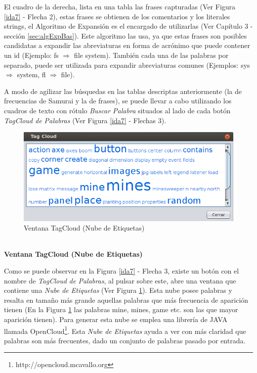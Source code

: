 El cuadro de la derecha, lista en una tabla las frases capturadas (Ver Figura \ref{ida7} - Flecha 2), estas frases se obtienen de los comentarios y los literales strings, el Algoritmo de Expansión es el encargado de utilizarlas (Ver Capítulo 3 - sección \ref{sec:algExpBas}). Este algoritmo las usa, ya que estas frases son posibles candidatas a expandir las abreviaturas en forma de acrónimo que puede contener un id (Ejemplo: \textsf{fs} $\Rightarrow$ \textsf{file system}). También cada una de las palabras por separado, puede ser utilizada para expandir abreviaturas comunes (Ejemplos: \textsf{sys} $\Rightarrow$ \textsf{system}, \textsf{fl} $\Rightarrow$ \textsf{file}).

A modo de agilizar las búsquedas en las tablas descriptas anteriormente (la de frecuencias de Samurai y la de frases), se puede llevar a cabo utilizando los cuadros de texto con rótulo \textit{Buscar Palabra} situados al lado de cada botón \textit{TagCloud de Palabras} (Ver Figura \ref{ida7} - Flechas 3).

\begin{figure}[t] %
\centerline{%
\includegraphics[scale= 0.75]{./cap4/ida_08.png}
}
\caption{Ventana TagCloud (Nube de Etiquetas)}
\label{ida8}
\end{figure}

\noindent \textbf{\\Ventana TagCloud (Nube de Etiquetas)\\} 

Como se puede observar en la Figura \ref{ida7} - Flecha 3, existe un botón con el nombre de \textit{TagCloud de Palabras}, al pulsar sobre este, abre una ventana que contiene una \textit{Nube de Etiquetas} (Ver Figura \ref{ida8}). Esta nube posee palabras y resalta en tamaño más grande aquellas palabras que más frecuencia de aparición tienen (En la Figura \ref{ida8} las palabras \textsf{mine}, \textsf{mines}, \textsf{game} etc. son las que mayor aparición tienen). Para generar esta nube se emplea una librería de JAVA llamada OpenCloud\footnote[1]{http://opencloud.mcavallo.org}.
Esta \textit{Nube de Etiquetas} ayuda a ver con más claridad que palabras son más frecuentes, dado un conjunto de palabras pasado por entrada. 

